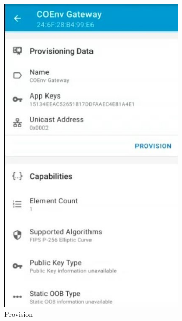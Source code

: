 \documentclass[../monografia.tex]{subfiles}
\begin{document}
\begin{figure}[h]
\begin{subfigure}[b]{0.22\textwidth}
		\includegraphics[width=\textwidth]{mesh-bind-2}
		\caption{Provision}
		\label{fig:mesh-bind-2}
	\end{subfigure} %
	\begin{subfigure}[b]{0.22\textwidth}
		\centering

\end{subfigure}
\end{figure}
\end{document}
